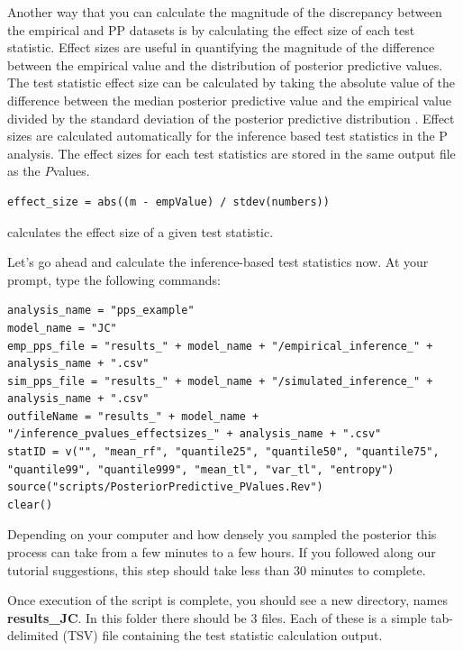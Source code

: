 \begin{equation *}
\begin{equation *}
\begin{equation *}
Another way that you can calculate the magnitude of the discrepancy between the empirical and PP datasets is by
calculating the effect size of each test statistic. Effect sizes are useful in quantifying the magnitude of the difference between the 
empirical value and the distribution of posterior predictive values. The test statistic effect size can be calculated by taking the 
absolute value of the difference between the median posterior predictive value and the empirical value divided by 
the standard deviation of the posterior predictive distribution \citep{Doyle2015-qb}. Effect sizes are calculated automatically for the inference based test statistics in the P analysis. The effect sizes for each test statistics are stored in the same output file as the \textit{P}\-values. 

{\tt \begin{snugshade*}
\begin{lstlisting}
effect_size = abs((m - empValue) / stdev(numbers))
\end{lstlisting}
\end{snugshade*}}


calculates the effect size of a given test statistic. 



Let's go ahead and calculate the inference-based test statistics now. At your \RevBayes prompt, type the 
following commands: 

{\tt \begin{Snugshade}[184,207,236]
\begin{lstlisting}  
analysis_name = "pps_example"
model_name = "JC"
emp_pps_file = "results_" + model_name + "/empirical_inference_" + analysis_name + ".csv"
sim_pps_file = "results_" + model_name + "/simulated_inference_" + analysis_name + ".csv"
outfileName = "results_" + model_name + "/inference_pvalues_effectsizes_" + analysis_name + ".csv"
statID = v("", "mean_rf", "quantile25", "quantile50", "quantile75", "quantile99", "quantile999", "mean_tl", "var_tl", "entropy")
source("scripts/PosteriorPredictive_PValues.Rev")
clear()
\end{lstlisting}
\end{Snugshade}}

Depending on your computer and how densely you sampled the posterior this process can take from a few minutes to a few hours. If you followed along our tutorial suggestions, this step should take less than 30 minutes to complete. 

Once execution of the script is complete, you should see a new directory, names \textbf{results\_JC}. In this folder there should be 3 files. Each of these is a simple tab-delimited (TSV) file containing the test statistic calculation output.


\end{equation *}
\end{equation *}
\end{equation *}
